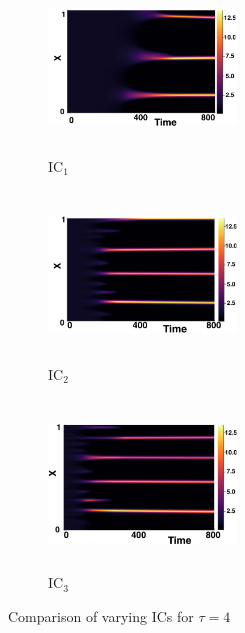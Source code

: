 \begin{figure}[H]
    \centering
    \begin{subfigure}[b]{0.32\textwidth}
        \centering
        \includegraphics[width=5cm,height=4.5cm]{gaff4.png}
        \caption{$\text{IC}_1$}
        \label{}
    \end{subfigure}
    \hfill
    \begin{subfigure}[b]{0.32\textwidth}
        \centering
        \includegraphics[width=5cm,height=4.5cm]{ic24.png}
        \caption{$\text{IC}_2$}
        \label{}
    \end{subfigure}
    \hfill
    \begin{subfigure}[b]{0.32\textwidth}
        \centering
        \includegraphics[width=5cm,height=4.5cm]{ic34.png}
        \caption{$\text{IC}_3$}
        \label{}
    \end{subfigure}
    \caption{Comparison of varying ICs for $\tau=4$}
    \label{fig:figtau4}
\end{figure}
